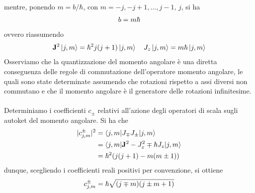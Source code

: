 \documentclass{article}
\begin{document}
mentre, ponendo $m = b/\hbar$, con $m = -j, -j + 1, \dots, j - 1, \, j$, si ha
\begin{gather}
    b = m\hbar \notag
\end{gather}
ovvero riassumendo
\begin{gather}
    \mathbf{J}^2\ket{j, m} = \hbar^2j(j+1)\ket{j, m} \quad J_z\ket{j, m} = m\hbar\ket{j, m} \notag
\end{gather}
Osserviamo che la quantizzazione del momento angolare è una diretta conseguenza delle regole di commutazione dell'operatore momento angolare, le quali sono state determinate assumendo che rotazioni rispetto a assi diversi non commutano e che il momento angolare è il generatore delle rotazioni infinitesime. \\ \\
Determiniamo i coefficienti $c_\pm$ relativi all'azione degli operatori di scala sugli autoket del momento angolare. Si ha che
\begin{align}
    |c^\pm_{j, m}|^2 &= \braket{j, m|J_\mp J_\pm|j, m} \notag \\
    &= \braket{j, m|\mathbf{J}^2 - J_z^2 \mp\hbar J_z|j, m} \notag \\
    &= \hbar^2(j(j+1) - m(m \pm 1)) \notag
\end{align}
dunque, scegliendo i coefficienti reali positivi per convenzione, si ottiene
\begin{gather}
    c^\pm_{j, m} = \hbar\sqrt{(j \mp m)(j \pm m+1)} \notag
\end{gather}
\end{document}
